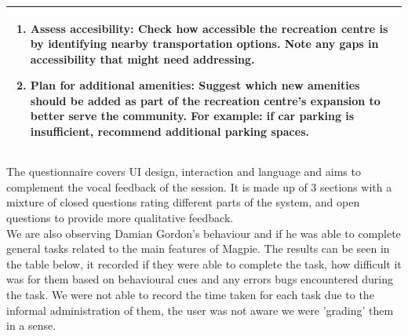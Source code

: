 \begin{table}[h!]
\begin{tabular}{|p{}|}
\begin{enumerate}
            \item \textbf{Assess accesibility:} Check how accessible the recreation centre is by identifying nearby transportation options. Note any gaps in accessibility that might need addressing.
            \item \textbf{Plan for additional amenities:} Suggest which new amenities should be added as part of the recreation centre's expansion to better serve the community. For example: if car parking is insufficient, recommend additional parking spaces.
        \end{enumerate}                                              \\
        \hline
    \end{tabular}
\end{table}

\noindent The questionnaire covers UI design, interaction and language and aims to complement the vocal feedback of the session. It is made up of 3 sections with a mixture of closed questions rating different parts of the system, and open questions to provide more qualitative feedback.\\

\noindent We are also observing Damian Gordon's behaviour and if he was able to complete general tasks related to the main features of Magpie. The results can be seen in the table below, it recorded if they were able to complete the task, how difficult it was for them based on behavioural cues and any errors bugs encountered during the task. We were not able to record the time taken for each task due to the informal administration of them, the user was not aware we were 'grading' them in a sense.\\

